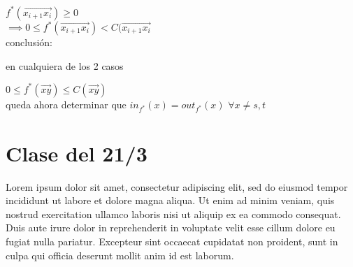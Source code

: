 \documentclass[12pt]{article}
\begin{document}
\(f^*(\overrightarrow{x_{i+1}x_{i}}) \geq 0\)\\

\(\implies 0 \leq f^*(\overrightarrow{x_{i+1}x_{i}}) <C(\overrightarrow{x_{i+1}x_{i}} \)\\

conclusión:

en cualquiera de los 2 casos

\(0 \leq f^*(\overrightarrow{xy}) \leq C(\overrightarrow{xy}) \)\\

queda ahora determinar que $in_{f^*}(x) = out_{f^*}(x)$ $\forall x \ne s, t$
\newpage

\section*{Clase del 21/3}
Lorem ipsum dolor sit amet, consectetur adipiscing elit, sed do eiusmod tempor incididunt ut labore et dolore magna aliqua. Ut enim ad minim veniam, quis nostrud exercitation ullamco laboris nisi ut aliquip ex ea commodo consequat. Duis aute irure dolor in reprehenderit in voluptate velit esse cillum dolore eu fugiat nulla pariatur. Excepteur sint occaecat cupidatat non proident, sunt in culpa qui officia deserunt mollit anim id est laborum.
\end{document}

